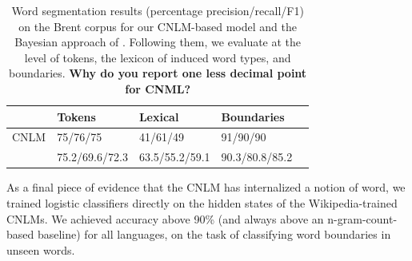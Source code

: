 

\begin{table}[t]
  \begin{center}
    \begin{tabular}{l|l|l|l|l}
      &Tokens & Lexical & Boundaries\\      \hline
	    CNLM & 75/76/75 & 41/61/49 & 91/90/90 \\
	    \citet{goldwater-bayesian-2009} & 75.2/69.6/72.3 & 63.5/55.2/59.1 & 90.3/80.8/85.2
    \end{tabular}
  \end{center}
	\caption{\label{tab:segmentation-results-brent} Word segmentation results (percentage precision/recall/F1)  on the Brent corpus for our CNLM-based model and the Bayesian approach of . Following them, we evaluate at the level of tokens, the lexicon of induced word types, and boundaries. \textbf{Why do you  report one less decimal point for CNML?}}
\end{table}

As a final piece of evidence that the CNLM has internalized a notion
of word, we trained logistic classifiers directly on the hidden states
of the Wikipedia-trained CNLMs. We achieved accuracy above 90\% (and
always above an n-gram-count-based baseline) for all languages, on the
task of classifying word boundaries in unseen words.

